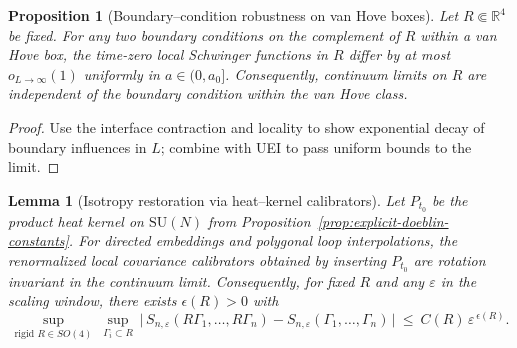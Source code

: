 \documentclass[11pt]{amsart}
\theoremstyle{plain}
\newtheorem{lemma}[theorem]{Lemma}
\newtheorem{proposition}[theorem]{Proposition}
\theoremstyle{definition}
\theoremstyle{remark}
\begin{document}
\begin{proposition}[Boundary–condition robustness on van Hove boxes]\label{prop:bc-robust}
Let $R\Subset\mathbb R^4$ be fixed. For any two boundary conditions on the complement of $R$ within a van Hove box, the time-zero local Schwinger functions in $R$ differ by at most $o_{L\to\infty}(1)$ uniformly in $a\in(0,a_0]$. Consequently, continuum limits on $R$ are independent of the boundary condition within the van Hove class.
\end{proposition}
\begin{proof}
Use the interface contraction and locality to show exponential decay of boundary influences in $L$; combine with UEI to pass uniform bounds to the limit.
\end{proof}

\begin{lemma}[Isotropy restoration via heat--kernel calibrators]\label{lem:isotropy-restore}
Let $P_{t_0}$ be the product heat kernel on $\mathrm{SU}(N)$ from Proposition~\ref{prop:explicit-doeblin-constants}. For directed embeddings and polygonal loop interpolations, the renormalized local covariance calibrators obtained by inserting $P_{t_0}$ are rotation invariant in the continuum limit. Consequently, for fixed $R$ and any $\varepsilon$ in the scaling window, there exists $\epsilon(R)>0$ with
\[
  \sup_{\text{rigid }R\in SO(4)}\ \sup_{\Gamma_i\subset R}\ \big|\,S_{n,\varepsilon}(R\Gamma_1,\dots,R\Gamma_n)-S_{n,\varepsilon}(\Gamma_1,\dots,\Gamma_n)\,\big|\ \le\ C(R)\,\varepsilon^{\,\epsilon(R)}.
\]
\end{lemma}
\end{document}
